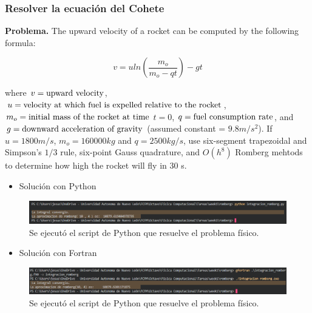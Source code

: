 \subsubsection{Resolver la ecuación del Cohete}

\vspace{0.5cm}

\noindent \textbf{Problema.} The upward velocity of a rocket can be computed by the following formula:

\begin{equation*}
    v = u ln\left(\frac{m_o}{m_o -qt}\right) -gt
\end{equation*}

\noindent where $v = \textnormal{upward velocity} $,  $u = \textnormal{velocity at which fuel is expelled relative to the rocket}$, $m_o = \textnormal{initial mass of the rocket at time} $ $t=0$,  $q = \textnormal{fuel consumption rate}$, and $g = \textnormal{downward acceleration of gravity}$ (assumed constant = $9.8 m/s^2 $). If $u=1800m/s$, $m_o=160000kg$ and $q=2500kg/s$, use six-segment trapezoidal and Simpson's $1/3$ rule, six-point Gauss quadrature, and $O(h^8)$ Romberg mehtods to determine how high the rocket will fly in 30 s.

\begin{itemize}
    \item Solución con Python
\end{itemize}

\begin{figure}[h!]
    \centering
    \includegraphics[width=1\linewidth]{images/python.png}
    \caption{Se ejecutó el script de Python que resuelve el problema físico.}
    \label{fig_python}
\end{figure}

\begin{itemize}
    \item Solución con Fortran
\end{itemize}

\begin{figure}[H]
    \centering
    \includegraphics[width=1\linewidth]{images/fortran.png}
    \caption{Se ejecutó el script de Python que resuelve el problema físico.}
    \label{fig_fortran}
\end{figure}

